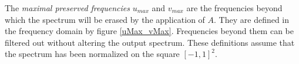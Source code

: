 		The \emph{maximal preserved frequencies}  $u_{max}$ and $v_{max}$ are the frequencies beyond which the spectrum will be erased by the application of $A$. They are defined in the frequency domain by figure \ref{uMax_vMax}. Frequencies beyond them can be filtered out without altering the output spectrum. These definitions assume that the spectrum has been normalized on the square $[-1,1]^2$.
		
		
